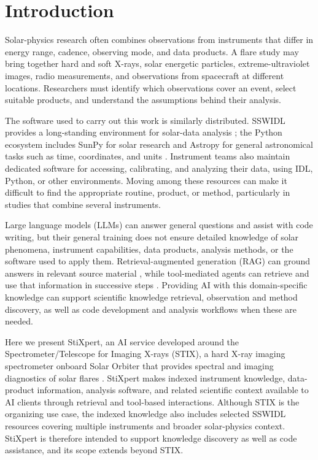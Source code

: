 \section{Introduction}
\label{sec:intro}

Solar-physics research often combines observations from instruments that differ in energy
range, cadence, observing mode, and data products.
A flare study may bring together hard and soft X-rays, solar energetic
particles, extreme-ultraviolet images, radio measurements, and observations from
spacecraft at different locations.
Researchers must identify which observations cover an event, select suitable products,
and understand the assumptions behind their analysis.

The software used to carry out this work is similarly distributed.
SSWIDL provides a long-standing environment for solar-data analysis
\cite{freeland1998}; the Python ecosystem includes SunPy for solar research
\cite{sunpy2020} and Astropy for general astronomical tasks such as time, coordinates,
and units \cite{astropy2018}.
Instrument teams also maintain dedicated software for accessing, calibrating, and
analyzing their data, using IDL, Python, or other environments.
Moving among these resources can make it difficult to find the appropriate routine,
product, or method, particularly in studies that combine several instruments.

Large language models (LLMs) can answer general questions and assist with code writing,
but their general training does not ensure detailed knowledge of solar phenomena,
instrument capabilities, data products, analysis methods, or the software used to apply
them.
Retrieval-augmented generation (RAG) can ground answers in relevant source material
\cite{lewis2020}, while tool-mediated agents can retrieve and use that information in
successive steps \cite{yao2023}.
Providing AI with this domain-specific knowledge can support scientific knowledge
retrieval, observation and method discovery, as well as code development and analysis
workflows when these are needed.

Here we present StiXpert, an AI service developed around the Spectrometer/Telescope for
Imaging X-rays (STIX), a hard X-ray imaging spectrometer onboard Solar Orbiter that
provides spectral and imaging diagnostics of solar flares \cite{krucker2020}.
StiXpert makes indexed instrument knowledge, data-product information, analysis
software, and related scientific context available to AI clients through retrieval
and tool-based interactions.
Although STIX is the organizing use case, the indexed knowledge also includes selected
SSWIDL resources covering multiple instruments and broader solar-physics
context.
StiXpert is therefore intended to support knowledge discovery as well as code
assistance, and its scope extends beyond STIX.

